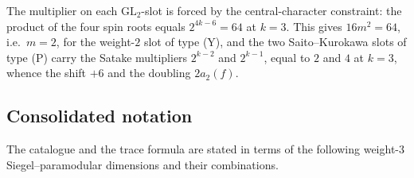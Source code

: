 \documentclass[10pt,a4paper]{amsart}
\begin{document}
	The multiplier on each $\mathrm{GL}_2$-slot is forced by the
	central-character constraint: the product of the four spin roots equals
	$2^{4k-6}=64$ at $k=3$. This gives $16m^2=64$, i.e.\ $m=2$, for the
	weight-$2$ slot of type (Y), and the two Saito--Kurokawa slots of type (P)
	carry the Satake multipliers $2^{k-2}$ and $2^{k-1}$, equal to $2$ and $4$
	at $k=3$, whence the shift $+6$ and the doubling $2a_2(f)$.
	
	\subsection{Consolidated notation}
	\label{ss:notation}
	
	The catalogue and the trace formula are stated in terms of the following
	weight-$3$ Siegel--paramodular dimensions and their combinations.
	
\end{document}
